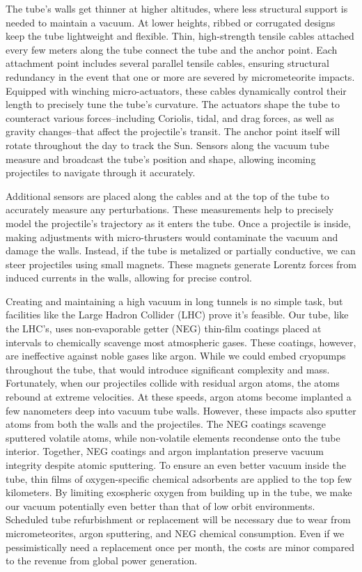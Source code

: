 \documentclass{article}
\begin{document}
The tube's walls get thinner at higher altitudes, where less structural support is needed to maintain a vacuum.  At lower heights, ribbed or corrugated designs  keep the tube lightweight and flexible. Thin, high-strength tensile cables attached every few meters along the tube connect the tube and the anchor point.  Each attachment point includes several parallel tensile cables, ensuring structural redundancy in the event that one or more are severed by micrometeorite impacts.   Equipped with winching micro-actuators, these cables dynamically control their length to precisely tune the tube's curvature. The actuators shape the tube to counteract various forces--including Coriolis, tidal, and drag forces, as well as gravity changes--that affect the projectile's transit. The anchor point itself will rotate throughout the day to track the Sun.  Sensors along the vacuum tube measure and broadcast the tube's position and shape, allowing incoming projectiles to navigate through it accurately.

Additional sensors are placed along the cables and at the top of the tube to accurately measure any perturbations. These measurements help to precisely model the projectile's trajectory as it enters the tube. Once a projectile is inside, making adjustments with micro-thrusters would contaminate the vacuum and damage the walls. Instead, if the tube is metalized or partially conductive, we can steer projectiles using small magnets. These magnets generate Lorentz forces from induced currents in the walls, allowing for precise control.

Creating and maintaining a high vacuum in long tunnels is no simple task, but facilities like the Large Hadron Collider (LHC) prove it's feasible. Our tube, like the LHC's, uses non-evaporable getter (NEG) \cite{neg_coatings} thin-film coatings placed at intervals to chemically scavenge most atmospheric gases. These coatings, however, are ineffective against noble gases like argon. While we could embed cryopumps throughout the tube, that would introduce significant complexity and mass. Fortunately, when our projectiles collide with residual argon atoms, the atoms rebound at extreme velocities.  At these speeds, argon atoms become implanted a few nanometers deep into vacuum tube walls.  However, these impacts also sputter atoms from both the walls and the projectiles. The NEG coatings scavenge sputtered volatile atoms, while non-volatile elements recondense onto the tube interior.  Together, NEG coatings and argon implantation preserve vacuum integrity despite atomic sputtering. To ensure an even better vacuum inside the tube, thin films of oxygen-specific chemical adsorbents  are applied to the top few kilometers. By limiting exospheric oxygen from building up in the tube, we make our vacuum potentially even better than that of low orbit environments.  Scheduled tube refurbishment or replacement will be necessary due to wear from micrometeorites, argon sputtering, and NEG chemical consumption. Even if we pessimistically need a replacement once per month, the costs are minor compared to the revenue from global power generation.
\end{document}
